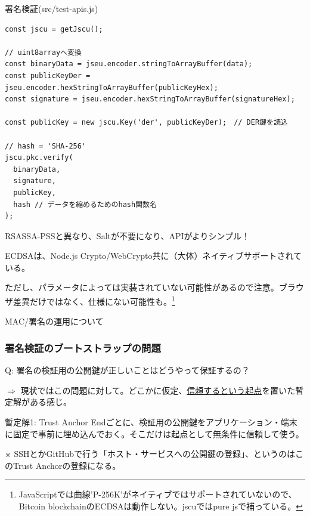 \documentclass[12pt,dvipdfmx]{beamer}
\begin{document}
\begin{frame}[fragile]

\begin{block}{\small 署名検証(src/test-apis.js)}
\scriptsize
\begin{verbatim}
const jscu = getJscu();

// uint8arrayへ変換
const binaryData = jseu.encoder.stringToArrayBuffer(data);
const publicKeyDer = jseu.encoder.hexStringToArrayBuffer(publicKeyHex);
const signature = jseu.encoder.hexStringToArrayBuffer(signatureHex);

const publicKey = new jscu.Key('der', publicKeyDer);　// DER鍵を読込

// hash = 'SHA-256'
jscu.pkc.verify(
  binaryData,
  signature,
  publicKey,
  hash // データを縮めるためのhash関数名
); 
\end{verbatim}
\end{block}
RSASSA-PSSと異なり、Saltが不要になり、\alert{APIがよりシンプル！}
\end{frame}

\begin{frame}
ECDSAは、Node.js Crypto/WebCrypto共に（大体）ネイティブサポートされている。

\alert{ただし、パラメータによっては実装されていない可能性がある}ので注意。ブラウザ差異だけではなく、仕様にない可能性も。\footnote[frame]{\scriptsize JavaScriptでは曲線'P-256K'がネイティブではサポートされていないので、Bitcoin blockchainのECDSAは動作しない。jscuではpure jsで補っている。}
\end{frame}

\begin{frame}
\centering
{\Large MAC/署名の運用について}
\end{frame}

\begin{frame}
\frametitle{署名検証のブートストラップの問題}

Q: \alert{署名の検証用の公開鍵が正しいことはどうやって保証するの？}

\vspace{2ex}

$\Rightarrow$ 現状ではこの問題に対して。どこかに仮定、\underline{信頼するという起点}を置いた暫定解がある感じ。


\end{frame}

\begin{frame}
\begin{block}{暫定解1: Trust Anchor}
Endごとに、\alert{検証用の公開鍵をアプリケーション・端末に固定で事前に埋め込んでおく}。そこだけは起点として無条件に信頼して使う。
\end{block}

※ SSHとかGitHubで行う「ホスト・サービスへの公開鍵の登録」、というのはこのTrust Anchorの登録になる。
\end{frame}
\end{document}
